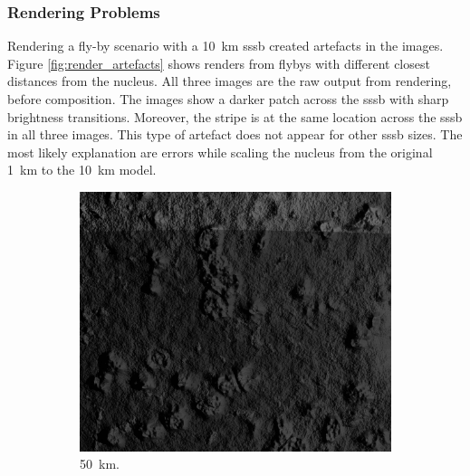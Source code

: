 \subsubsection{Rendering Problems}
Rendering a fly-by scenario with a \SI{10}{\kilo\meter} \gls{sssb} created artefacts in the images. Figure \ref{fig:render_artefacts} shows renders from flybys with different closest distances from the nucleus. All three images are the raw output from rendering, before composition. The images show a darker patch across the \gls{sssb} with sharp brightness transitions. Moreover, the stripe is at the same location across the \gls{sssb} in all three images. This type of artefact does not appear for other \gls{sssb} sizes. The most likely explanation are errors while scaling the nucleus from the original \SI{1}{\kilo\meter} to the \SI{10}{\kilo\meter} model.
\begin{figure}[htb]
    \centering
        \begin{subfigure}[b]{0.32\textwidth}
            \centering
            \includegraphics[width=\textwidth]{doc/thesis/0_figures/rendering_artefacts/50_10_SssbOnly_2017-08-15T115845-190000.jpg}
            \caption{\SI{50}{\kilo\meter}.}
            \label{fig:render_artefacts_50}
        \end{subfigure}
        \begin{subfigure}[b]{0.32\textwidth}
            \centering

\end{subfigure}
\end{figure}

